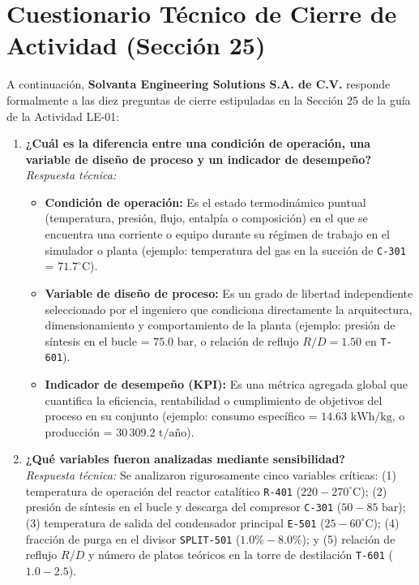 \documentclass[10pt,letterpaper]{article}
\begin{document}
\section{Cuestionario Técnico de Cierre de Actividad (Sección 25)}

A continuación, \textbf{Solvanta Engineering Solutions S.A. de C.V.} responde formalmente a las diez preguntas de cierre estipuladas en la Sección 25 de la guía de la Actividad LE-01:

\begin{enumerate}[leftmargin=*,itemsep=7pt]
    \item \textbf{¿Cuál es la diferencia entre una condición de operación, una variable de diseño de proceso y un indicador de desempeño?}\\
    \textit{Respuesta técnica:}
    \begin{itemize}
        \item \textbf{Condición de operación:} Es el estado termodinámico puntual (temperatura, presión, flujo, entalpía o composición) en el que se encuentra una corriente o equipo durante su régimen de trabajo en el simulador o planta (ejemplo: temperatura del gas en la succión de \texttt{C-301} = $71.7^\circ\text{C}$).
        \item \textbf{Variable de diseño de proceso:} Es un grado de libertad independiente seleccionado por el ingeniero que condiciona directamente la arquitectura, dimensionamiento y comportamiento de la planta (ejemplo: presión de síntesis en el bucle = $75.0\text{ bar}$, o relación de reflujo $R/D = 1.50$ en \texttt{T-601}).
        \item \textbf{Indicador de desempeño (KPI):} Es una métrica agregada global que cuantifica la eficiencia, rentabilidad o cumplimiento de objetivos del proceso en su conjunto (ejemplo: consumo específico = $14.63\text{ kWh/kg}$, o producción = $30\,309.2\text{ t/año}$).
    \end{itemize}

    \item \textbf{¿Qué variables fueron analizadas mediante sensibilidad?}\\
    \textit{Respuesta técnica:} Se analizaron rigurosamente cinco variables críticas: (1) temperatura de operación del reactor catalítico \texttt{R-401} ($220-270^\circ\text{C}$); (2) presión de síntesis en el bucle y descarga del compresor \texttt{C-301} ($50-85\text{ bar}$); (3) temperatura de salida del condensador principal \texttt{E-501} ($25-60^\circ\text{C}$); (4) fracción de purga en el divisor \texttt{SPLIT-501} ($1.0\%-8.0\%$); y (5) relación de reflujo $R/D$ y número de platos teóricos en la torre de destilación \texttt{T-601} ($1.0-2.5$).


\end{enumerate}
\end{document}
